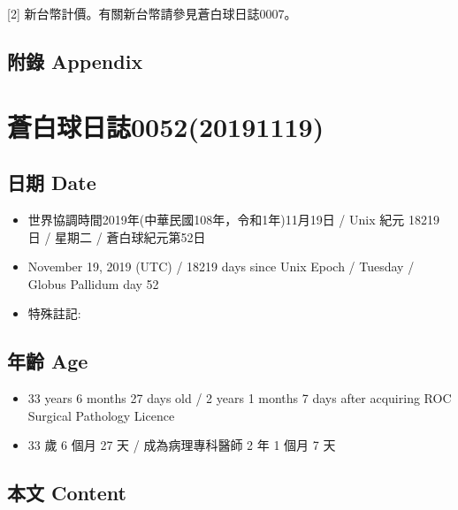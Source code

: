 \documentclass[a5paper, 12pt
]{book}
\providecommand{\tightlist}{%
  \setlength{\itemsep}{0pt}\setlength{\parskip}{0pt}}
\begin{document}
{[}2{]} 新台幣計價。有關新台幣請參見蒼白球日誌0007。

\hypertarget{ux9644ux9304-appendix-43}{%
\subsection{附錄 Appendix}\label{ux9644ux9304-appendix-43}}

\hypertarget{ux84bcux767dux7403ux65e5ux8a8c005220191119}{%
\section{蒼白球日誌0052(20191119)}\label{ux84bcux767dux7403ux65e5ux8a8c005220191119}}

\hypertarget{ux65e5ux671f-date-51}{%
\subsection{日期 Date}\label{ux65e5ux671f-date-51}}

\begin{itemize}
\tightlist
\item
  世界協調時間2019年(中華民國108年，令和1年)11月19日 / Unix 紀元 18219
  日 / 星期二 / 蒼白球紀元第52日
\item
  November 19, 2019 (UTC) / 18219 days since Unix Epoch / Tuesday /
  Globus Pallidum day 52
\item
  特殊註記:
\end{itemize}

\hypertarget{ux5e74ux9f61-age-51}{%
\subsection{年齡 Age}\label{ux5e74ux9f61-age-51}}

\begin{itemize}
\tightlist
\item
  33 years 6 months 27 days old / 2 years 1 months 7 days after
  acquiring ROC Surgical Pathology Licence
\item
  33 歲 6 個月 27 天 / 成為病理專科醫師 2 年 1 個月 7 天
\end{itemize}

\hypertarget{ux672cux6587-content-51}{%
\subsection{本文 Content}\label{ux672cux6587-content-51}}
\end{document}
